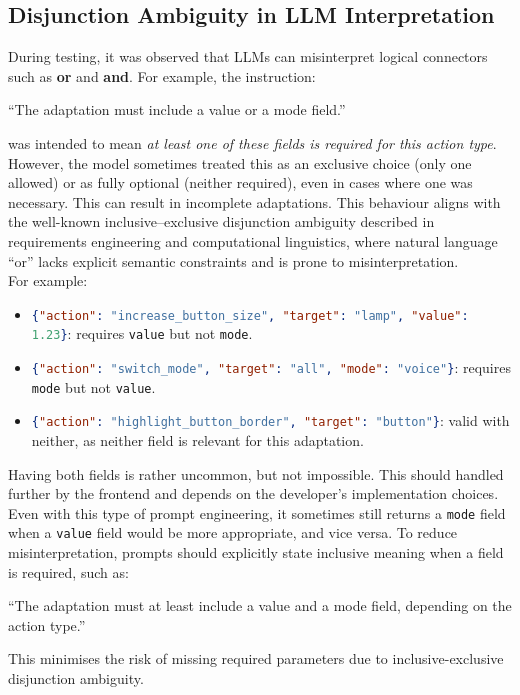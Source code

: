 \documentclass[openany]{book}
\newcommand{\mdblockquote}[1]{  \begin{myquote}  #1  \end{myquote}  }
\begin{document}
\subsection{Disjunction Ambiguity in LLM Interpretation}
During testing, it was observed that LLMs can misinterpret logical connectors such as \textbf{or} and \textbf{and}. For example, the instruction:
\mdblockquote{“The adaptation must include a value or a mode field.”}
was intended to mean \textit{at least one of these fields is required for this action type}. However, the model sometimes treated this as an exclusive choice (only one allowed) or as fully optional (neither required), even in cases where one was necessary. This can result in incomplete adaptations. This behaviour aligns with the well-known inclusive–exclusive disjunction ambiguity described in requirements engineering and computational linguistics, where natural language “or” lacks explicit semantic constraints and is prone to misinterpretation. \\
For example:
\begin{itemize}
    \item \lstinline[language=json]|{"action": "increase_button_size", "target": "lamp", "value": 1.23}|: requires \texttt{value} but not \texttt{mode}.
    \item \lstinline[language=json]|{"action": "switch_mode", "target": "all", "mode": "voice"}|: requires \texttt{mode} but not \texttt{value}.
    \item \lstinline[language=json]|{"action": "highlight_button_border", "target": "button"}|: valid with neither, as neither field is relevant for this adaptation.
\end{itemize}
Having both fields is rather uncommon, but not impossible. This should handled further by the frontend and depends on the developer's implementation choices. Even with this type of prompt engineering, it sometimes still returns a \texttt{mode} field when a \texttt{value} field would be more appropriate, and vice versa.
To reduce misinterpretation, prompts should explicitly state inclusive meaning when a field is required, such as:
\mdblockquote{“The adaptation must at least include a value and a mode field, depending on the action type.”}
This minimises the risk of missing required parameters due to inclusive-exclusive disjunction ambiguity.
\end{document}
